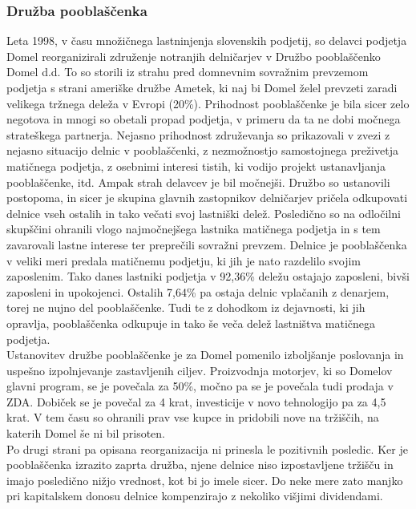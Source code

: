\documentclass[12pt,a4paper]{amsart}
\theoremstyle{definition} %
\theoremstyle{plain} %
\begin{document}
\subsubsection{Družba pooblaščenka}
Leta 1998, v času množičnega lastninjenja slovenskih podjetij, so delavci podjetja Domel reorganizirali združenje notranjih delničarjev v Družbo pooblaščenko Domel d.d. To so storili iz strahu pred domnevnim sovražnim prevzemom podjetja s strani ameriške družbe Ametek, ki naj bi Domel želel prevzeti zaradi velikega tržnega deleža v Evropi (20\%). Prihodnost pooblaščenke je bila sicer zelo negotova in mnogi so obetali propad podjetja, v primeru da ta ne dobi močnega strateškega partnerja. Nejasno prihodnost združevanja so prikazovali v zvezi z nejasno situacijo delnic v pooblaščenki, z nezmožnostjo samostojnega preživetja matičnega podjetja, z osebnimi interesi tistih, ki vodijo projekt ustanavljanja pooblaščenke, itd. Ampak strah delavcev je bil močnejši. Družbo so ustanovili postopoma, in sicer je skupina glavnih zastopnikov delničarjev pričela odkupovati delnice vseh ostalih in tako večati svoj lastniški delež. Posledično so na odločilni skupščini ohranili vlogo najmočnejšega lastnika matičnega podjetja in s tem zavarovali lastne interese ter preprečili sovražni prevzem. Delnice je pooblaščenka v veliki meri predala matičnemu podjetju, ki jih je nato razdelilo svojim zaposlenim. Tako danes lastniki podjetja v 92,36\% deležu ostajajo zaposleni, bivši zaposleni in upokojenci. Ostalih 7,64\% pa ostaja delnic vplačanih z denarjem, torej ne nujno del pooblaščenke. Tudi te z dohodkom iz dejavnosti, ki jih opravlja, pooblaščenka odkupuje in tako še veča delež lastništva matičnega podjetja. \\
Ustanovitev družbe pooblaščenke je za Domel pomenilo izboljšanje poslovanja in uspešno izpolnjevanje zastavljenih ciljev. Proizvodnja motorjev, ki so Domelov glavni program, se je povečala za 50\%, močno pa se je povečala tudi prodaja v ZDA. Dobiček se je povečal za 4 krat, investicije v novo tehnologijo pa za 4,5 krat. V tem času so ohranili prav vse kupce in pridobili nove na tržiščih, na katerih Domel še ni bil prisoten.\\
Po drugi strani pa opisana reorganizacija ni prinesla le pozitivnih posledic. Ker je pooblaščenka izrazito zaprta družba, njene delnice niso izpostavljene tržišču in imajo posledično nižjo vrednost, kot bi jo imele sicer. Do neke mere zato manjko pri kapitalskem donosu delnice kompenzirajo z nekoliko višjimi dividendami.
\end{document}
